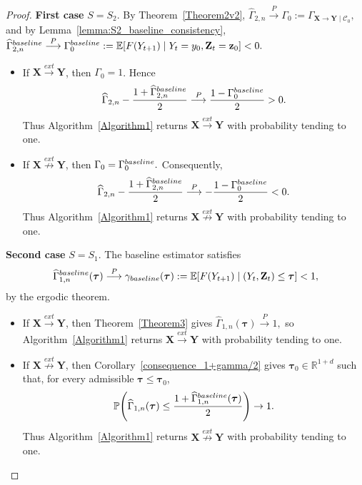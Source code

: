 \documentclass[a4paper,11pt]{article}
\newcommand{\baseline}{{\rm baseline}}
\begin{document}
\begin{proof}
\textbf{First case} \(S=S_2\). By Theorem~\ref{Theorem2v2},
\(
    \widehat\Gamma_{2,n}
    \overset{P}{\longrightarrow}
    \Gamma_0
    :=
    \Gamma_{\mathbf X\to\mathbf Y\mid\mathcal C_0},
\)
and by Lemma~\ref{lemma:S2_baseline_consistency},
\(
    \widehat\Gamma^{\baseline}_{2,n}
    \overset{P}{\longrightarrow}
    \Gamma^{\baseline}_0
    :=
    \mathbb E[
        F(Y_{t+1})\mid Y_t=y_0,\mathbf Z_t=\mathbf z_0
    ]<0.
\)

\begin{itemize}
    \item If \(\mathbf X\overset{ext}{\to}\mathbf Y\), then \(\Gamma_0=1\). Hence
\[
    \widehat\Gamma_{2,n}
    -
    \frac{1+\widehat\Gamma^{\baseline}_{2,n}}{2}
    \overset{P}{\longrightarrow}
    \frac{1-\Gamma^{\baseline}_0}{2}
    >0.
\]
Thus Algorithm~\ref{Algorithm1} returns
\(\mathbf X\overset{ext}{\to}\mathbf Y\) with probability tending to one.

 \item If \(\mathbf X\overset{ext}{\not\to}\mathbf Y\), then \(
    \Gamma_0=\Gamma^{\baseline}_0.
\) Consequently,
\[
    \widehat\Gamma_{2,n}
    -
    \frac{1+\widehat\Gamma^{\baseline}_{2,n}}{2}
    \overset{P}{\longrightarrow}
    -\frac{1-\Gamma^{\baseline}_0}{2}
    <0.
\] Thus Algorithm~\ref{Algorithm1} returns
\(\mathbf X\overset{ext}{\not\to}\mathbf Y\) with probability tending to one.
\end{itemize}


\textbf{Second case} \(S=S_1\). The baseline estimator satisfies
\[
    \widehat\Gamma^{\baseline}_{1,n}(\boldsymbol{\tau})
    \overset{P}{\longrightarrow}
    \gamma_{\baseline}(\boldsymbol{\tau})
    :=
    \mathbb E[
        F(Y_{t+1})
        \mid
        (Y_t,\mathbf Z_t)\leq\boldsymbol{\tau}
    ]<1,
\]
by the ergodic theorem. 

\begin{itemize}
 \item If \(\mathbf X\overset{ext}{\to}\mathbf Y\), then
Theorem~\ref{Theorem3} gives
\(
    \widehat\Gamma_{1,n}(\boldsymbol{\tau})
    \overset{P}{\longrightarrow}
    1,
\)
so Algorithm~\ref{Algorithm1} returns
\(\mathbf X\overset{ext}{\to}\mathbf Y\) with probability tending to one.

 \item If \(\mathbf X\overset{ext}{\not\to}\mathbf Y\), then
Corollary~\ref{consequence_1+gamma/2} gives
\(\boldsymbol{\tau}_0\in\mathbb R^{1+d}\) such that, for every admissible
\(\boldsymbol{\tau}\leq\boldsymbol{\tau}_0\),
\[
    \mathbb P\!\left(
        \widehat\Gamma_{1,n}(\boldsymbol{\tau})
        \leq
        \frac{
            1+
            \widehat\Gamma^{\baseline}_{1,n}(\boldsymbol{\tau})
        }{2}
    \right)
    \to 1.
\]
Thus Algorithm~\ref{Algorithm1} returns
\(\mathbf X\overset{ext}{\not\to}\mathbf Y\) with probability tending to one.
\end{itemize}
\end{proof}
\end{document}
